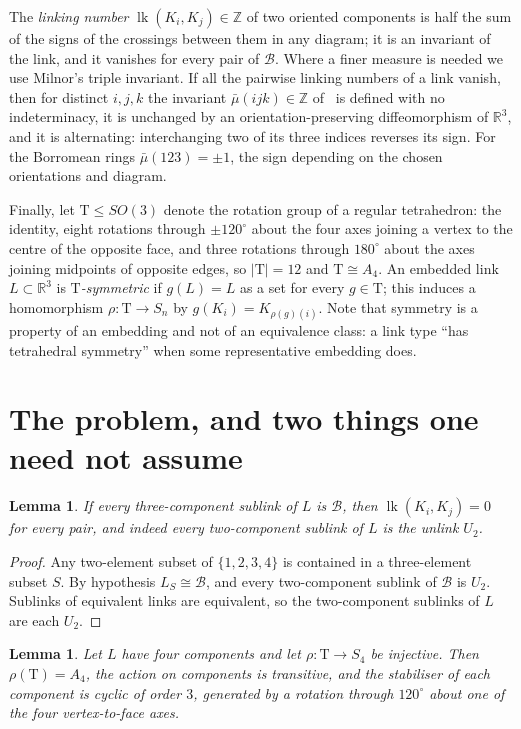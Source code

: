 \documentclass[11pt,a4paper]{article}
\theoremstyle{plain}
\newtheorem{lemma}[theorem]{Lemma}
\theoremstyle{definition}
\newcommand{\RR}{\mathbb{R}}
\newcommand{\ZZ}{\mathbb{Z}}
\newcommand{\Tet}{\mathrm{T}}
\newcommand{\lk}{\operatorname{lk}}
\newcommand{\Bor}{\mathcal{B}}
\newcommand{\abs}[1]{\left|#1\right|}
\begin{document}
The \emph{linking number} $\lk(K_i,K_j)\in\ZZ$ of two oriented components is
half the sum of the signs of the crossings between them in any diagram; it is an
invariant of the link, and it vanishes for every pair of $\Bor$. Where a finer
measure is needed we use Milnor's triple invariant. If all the pairwise linking
numbers of a link vanish, then for distinct $i,j,k$ the invariant
$\bar\mu(ijk)\in\ZZ$ of~\cite{milnor1954,milnor1957} is defined with no
indeterminacy, it is unchanged by an orientation-preserving diffeomorphism of
$\RR^3$, and it is alternating: interchanging two of its three indices reverses
its sign. For the Borromean rings $\bar\mu(123)=\pm1$, the sign depending on the
chosen orientations and diagram.

Finally, let $\Tet\le SO(3)$ denote the rotation group of a regular tetrahedron:
the identity, eight rotations through $\pm120^\circ$ about the four axes joining
a vertex to the centre of the opposite face, and three rotations through
$180^\circ$ about the axes joining midpoints of opposite edges, so
$\abs{\Tet}=12$ and $\Tet\cong A_4$. An embedded link $L\subset\RR^3$ is
\emph{$\Tet$-symmetric} if $g(L)=L$ as a set for every $g\in\Tet$; this induces
a homomorphism $\rho\colon\Tet\to S_n$ by $g(K_i)=K_{\rho(g)(i)}$. Note that
symmetry is a property of an embedding and not of an equivalence class: a link
type ``has tetrahedral symmetry'' when some representative embedding does.

\section{The problem, and two things one need not assume}\label{sec:problem}

\begin{lemma}\label{lem:pairs}
If every three-component sublink of $L$ is $\Bor$, then $\lk(K_i,K_j)=0$ for
every pair, and indeed every two-component sublink of $L$ is the unlink $U_2$.
\end{lemma}

\begin{proof}
Any two-element subset of $\{1,2,3,4\}$ is contained in a three-element subset
$S$. By hypothesis $L_S\cong\Bor$, and every two-component sublink of $\Bor$ is
$U_2$. Sublinks of equivalent links are equivalent, so the two-component
sublinks of $L$ are each $U_2$.
\end{proof}

\begin{lemma}\label{lem:transitive}
Let $L$ have four components and let $\rho\colon\Tet\to S_4$ be injective. Then
$\rho(\Tet)=A_4$, the action on components is transitive, and the stabiliser of
each component is cyclic of order $3$, generated by a rotation through
$120^\circ$ about one of the four vertex-to-face axes.
\end{lemma}
\end{document}
